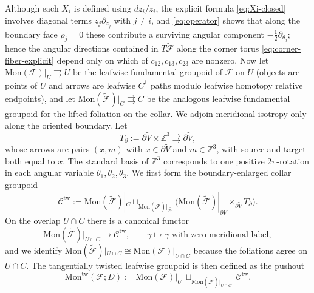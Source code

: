 \documentclass[11pt]{amsart}
\theoremstyle{plain}
\theoremstyle{definition}
\newcommand{\Mon}{\mathrm{Mon}}
\theoremstyle{definition}
\begin{document}
Although each $X_i$ is defined using $dz_i/z_i$, the explicit formula \eqref{eq:Xi-closed} involves diagonal terms $z_j\partial_{z_j}$ with $j\neq i$, and \eqref{eq:operator} shows that along the boundary face $\rho_j=0$ these contribute a surviving angular component $-\tfrac12\partial_{\theta_j}$; hence the angular directions contained in $T\widetilde{\mathcal F}$ along the corner torus \eqref{eq:corner-fiber-explicit} depend only on which of $c_{12},c_{13},c_{23}$ are nonzero. Now let $\Mon(\mathcal F)|_U\rightrightarrows U$ be the leafwise fundamental groupoid of $\mathcal F$ on $U$ (objects are points of $U$ and arrows are leafwise $C^1$ paths modulo leafwise homotopy relative endpoints), and let $\Mon(\widetilde{\mathcal F})|_C\rightrightarrows C$ be the analogous leafwise fundamental groupoid for the lifted foliation on the collar. We adjoin meridional isotropy only along the oriented boundary. Let
\begin{equation}\label{eq:meridional-T}
T_\partial:=\partial\widetilde V\times\mathbb{Z}^3\rightrightarrows \partial\widetilde V,
\end{equation}
whose arrows are pairs $(x,m)$ with $x\in\partial\widetilde V$ and $m\in\mathbb{Z}^3$, with source and target both equal to $x$. The standard basis of $\mathbb{Z}^3$ corresponds to one positive $2\pi$-rotation in each angular variable $\theta_1,\theta_2,\theta_3$. We first form the boundary-enlarged collar groupoid
\begin{equation}\label{eq:product-groupoid}
\mathcal C^{\mathrm{tw}}
:=
\Mon(\widetilde{\mathcal F})|_C
\sqcup_{\Mon(\widetilde{\mathcal F})|_{\partial\widetilde V}}
\bigl(\Mon(\widetilde{\mathcal F})|_{\partial\widetilde V}\times_{\partial\widetilde V}T_\partial\bigr).
\end{equation}
On the overlap $U\cap C$ there is a canonical functor
\begin{equation}\label{eq:ff-overlap}
\Mon(\widetilde{\mathcal F})|_{U\cap C}\longrightarrow \mathcal C^{\mathrm{tw}},
\qquad
\gamma\longmapsto\gamma \text{ with zero meridional label},
\end{equation}
and we identify $\Mon(\widetilde{\mathcal F})|_{U\cap C}\cong \Mon(\mathcal F)|_{U\cap C}$ because the foliations agree on $U\cap C$. The tangentially twisted leafwise groupoid is then defined as the pushout
\begin{equation}\label{eq:pushout}
\Mon^{\mathrm{tw}}(\mathcal F;D)
:=
\Mon(\mathcal F)|_U\ \sqcup_{\Mon(\widetilde{\mathcal F})|_{U\cap C}}\ \mathcal C^{\mathrm{tw}}.
\end{equation}
\end{document}

